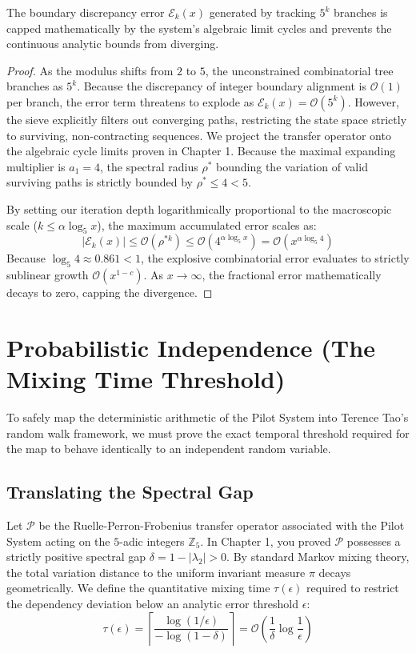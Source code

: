 \begin{theorem}
\leanok
The boundary discrepancy error $\mathcal{E}_k(x)$ generated by tracking $5^k$ branches is capped mathematically by the system's algebraic limit cycles and prevents the continuous analytic bounds from diverging.
\end{theorem}
\begin{proof}
As the modulus shifts from $2$ to $5$, the unconstrained combinatorial tree branches as $5^k$. Because the discrepancy of integer boundary alignment is $\mathcal{O}(1)$ per branch, the error term threatens to explode as $\mathcal{E}_k(x) = \mathcal{O}(5^k)$. However, the sieve explicitly filters out converging paths, restricting the state space strictly to surviving, non-contracting sequences. We project the transfer operator onto the algebraic cycle limits proven in Chapter 1. Because the maximal expanding multiplier is $a_1 = 4$, the spectral radius $\rho^*$ bounding the variation of valid surviving paths is strictly bounded by $\rho^* \le 4 < 5$.

By setting our iteration depth logarithmically proportional to the macroscopic scale ($k \le \alpha \log_5 x$), the maximum accumulated error scales as:
$$ |\mathcal{E}_k(x)| \le \mathcal{O}(\rho^{*k}) \le \mathcal{O}(4^{\alpha \log_5 x}) = \mathcal{O}(x^{\alpha \log_5 4}) $$
Because $\log_5 4 \approx 0.861 < 1$, the explosive combinatorial error evaluates to strictly sublinear growth $\mathcal{O}(x^{1-c})$. As $x \to \infty$, the fractional error mathematically decays to zero, capping the divergence.
\end{proof}

\chapter{Probabilistic Independence (The Mixing Time Threshold)}

To safely map the deterministic arithmetic of the Pilot System into Terence Tao's random walk framework, we must prove the exact temporal threshold required for the map to behave identically to an independent random variable.

\section{Translating the Spectral Gap}

Let $\mathcal{P}$ be the Ruelle-Perron-Frobenius transfer operator associated with the Pilot System acting on the $5$-adic integers $\mathbb{Z}_5$. In Chapter 1, you proved $\mathcal{P}$ possesses a strictly positive spectral gap $\delta = 1 - |\lambda_2| > 0$. By standard Markov mixing theory, the total variation distance to the uniform invariant measure $\pi$ decays geometrically. We define the quantitative mixing time $\tau(\epsilon)$ required to restrict the dependency deviation below an analytic error threshold $\epsilon$:
$$ \tau(\epsilon) = \left\lceil \frac{\log(1/\epsilon)}{-\log(1-\delta)} \right\rceil = \mathcal{O}\left( \frac{1}{\delta} \log \frac{1}{\epsilon} \right) $$

